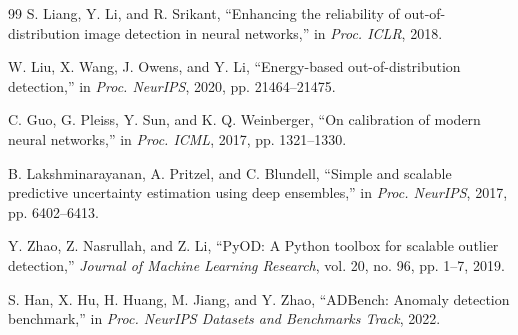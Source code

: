 \documentclass[journal]{IEEEtran}
\begin{document}
\begin{thebibliography}{99}
S. Liang, Y. Li, and R. Srikant, ``Enhancing the reliability of out-of-distribution image detection in neural networks,'' in \textit{Proc. ICLR}, 2018.

W. Liu, X. Wang, J. Owens, and Y. Li, ``Energy-based out-of-distribution detection,'' in \textit{Proc. NeurIPS}, 2020, pp. 21464--21475.

C. Guo, G. Pleiss, Y. Sun, and K. Q. Weinberger, ``On calibration of modern neural networks,'' in \textit{Proc. ICML}, 2017, pp. 1321--1330.

B. Lakshminarayanan, A. Pritzel, and C. Blundell, ``Simple and scalable predictive uncertainty estimation using deep ensembles,'' in \textit{Proc. NeurIPS}, 2017, pp. 6402--6413.

Y. Zhao, Z. Nasrullah, and Z. Li, ``PyOD: A Python toolbox for scalable outlier detection,'' \textit{Journal of Machine Learning Research}, vol. 20, no. 96, pp. 1--7, 2019.

S. Han, X. Hu, H. Huang, M. Jiang, and Y. Zhao, ``ADBench: Anomaly detection benchmark,'' in \textit{Proc. NeurIPS Datasets and Benchmarks Track}, 2022.

\end{thebibliography}
\end{document}
